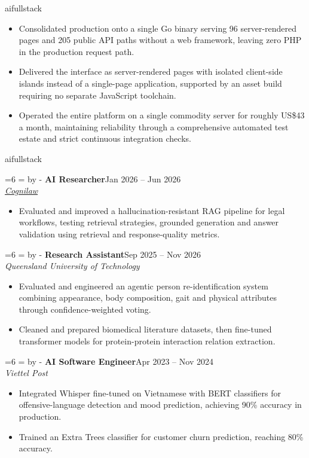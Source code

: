 \documentclass[11pt, a4paper]{article}
\newcommand{\needroom}[1]{%
  \par\begingroup
  \dimen0=#1\relax
  \dimen2=\pagegoal\relax\advance\dimen2 by -\pagetotal\relax
  \ifdim\dimen0>\dimen2\relax\newpage\fi
  \endgroup
}
\newcommand{\role}[4]{%
  \needroom{6\baselineskip}%
  \noindent\textbf{#1}\hfill\textcolor{muted}{#2}\\
  \textit{#3}\hfill\textcolor{muted}{#4}\vspace{3pt}%
}
\def\variant{ai}
\newcommand{\FULL}[1]{\ifx\variant\VFULL#1\fi}
\def\VFULL{fullstack}
\newcommand{\NOTFULL}[1]{\ifx\variant\VFULL\else#1\fi}
\begin{document}
\FULL{
\begin{itemize}
\item Consolidated production onto a single Go binary serving 96 server-rendered pages and 205 public API paths without a web framework, leaving zero PHP in the production request path.
\item Delivered the interface as server-rendered pages with isolated client-side islands instead of a single-page application, supported by an asset build requiring no separate JavaScript toolchain.
\item Operated the entire platform on a single commodity server for roughly US\$43 a month, maintaining reliability through a comprehensive automated test estate and strict continuous integration checks.
\end{itemize}
}

\vspace{4pt}

\NOTFULL{
\role{AI Researcher}{Jan 2026 -- Jun 2026}
{\href{https://cognilawai.com/}{Cognilaw}}{}
\begin{itemize}
\item Evaluated and improved a hallucination-resistant RAG pipeline for legal workflows, testing retrieval strategies, grounded generation and answer validation using retrieval and response-quality metrics.
\end{itemize}

\vspace{4pt}
}

\role{Research Assistant}{Sep 2025 -- Nov 2026}
{Queensland University of Technology}{}
\begin{itemize}
\item Evaluated and engineered an agentic person re-identification system combining appearance, body composition, gait and physical attributes through confidence-weighted voting.
\item Cleaned and prepared biomedical literature datasets, then fine-tuned transformer models for protein-protein interaction relation extraction.
\end{itemize}

\vspace{4pt}

\role{AI Software Engineer}{Apr 2023 -- Nov 2024}
{Viettel Post}{}
\begin{itemize}
\item Integrated Whisper fine-tuned on Vietnamese with BERT classifiers for offensive-language detection and mood prediction, achieving 90\% accuracy in production.
\item Trained an Extra Trees classifier for customer churn prediction, reaching 80\% accuracy.
\end{itemize}
\end{document}
